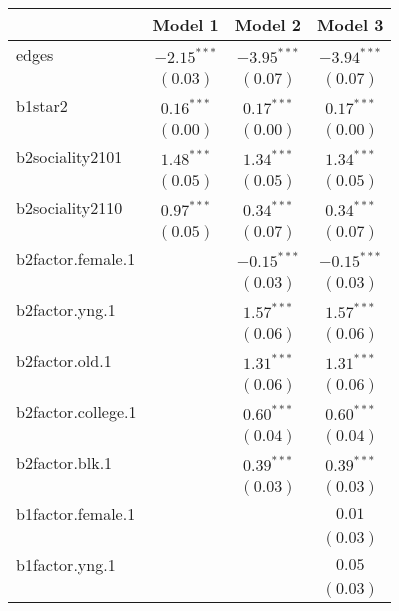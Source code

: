
\begin{table}
\begin{center}
\begin{tabular}{l c c c}
\hline
 & Model 1 & Model 2 & Model 3 \\
\hline
edges              & $-2.15^{***}$ & $-3.95^{***}$ & $-3.94^{***}$ \\
                   & $(0.03)$      & $(0.07)$      & $(0.07)$      \\
b1star2            & $0.16^{***}$  & $0.17^{***}$  & $0.17^{***}$  \\
                   & $(0.00)$      & $(0.00)$      & $(0.00)$      \\
b2sociality2101    & $1.48^{***}$  & $1.34^{***}$  & $1.34^{***}$  \\
                   & $(0.05)$      & $(0.05)$      & $(0.05)$      \\
b2sociality2110    & $0.97^{***}$  & $0.34^{***}$  & $0.34^{***}$  \\
                   & $(0.05)$      & $(0.07)$      & $(0.07)$      \\
b2factor.female.1  &               & $-0.15^{***}$ & $-0.15^{***}$ \\
                   &               & $(0.03)$      & $(0.03)$      \\
b2factor.yng.1     &               & $1.57^{***}$  & $1.57^{***}$  \\
                   &               & $(0.06)$      & $(0.06)$      \\
b2factor.old.1     &               & $1.31^{***}$  & $1.31^{***}$  \\
                   &               & $(0.06)$      & $(0.06)$      \\
b2factor.college.1 &               & $0.60^{***}$  & $0.60^{***}$  \\
                   &               & $(0.04)$      & $(0.04)$      \\
b2factor.blk.1     &               & $0.39^{***}$  & $0.39^{***}$  \\
                   &               & $(0.03)$      & $(0.03)$      \\
b1factor.female.1  &               &               & $0.01$        \\
                   &               &               & $(0.03)$      \\
b1factor.yng.1     &               &               & $0.05$        \\
                   &               &               & $(0.03)$      \\

\end{tabular}
\end{center}
\end{table}
